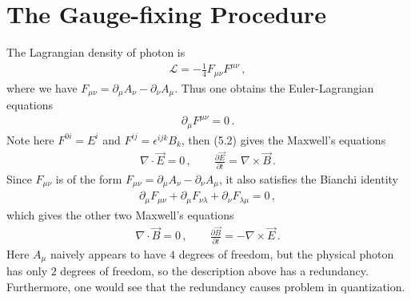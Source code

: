 \documentclass[11pt, onesided]{book}
\theoremstyle{break}
\theoremstyle{break}
\newcommand{\pd}{\partial}
\begin{document}
\section[The Gauge-fixing Procedure]{\color{red}The Gauge-fixing Procedure\color{black}}
The Lagrangian density of photon is
\begin{align}
\mathcal{L} = -\frac{1}{4}F_{\mu\nu}F^{\mu\nu}\,,
\end{align}
where we have $F_{\mu\nu} = \pd_\mu A_\nu - \pd_\nu A_\mu$. Thus one obtains the Euler-Lagrangian equations
\begin{align}
\pd_\mu F^{\mu\nu} = 0\,.
\end{align}
Note here $F^{0i} = E^i$ and $F^{ij} = \epsilon^{ijk}B_k$, then (5.2) gives the Maxwell's equations
\begin{align*}
\nabla \cdot \vec{E} = 0\,,\qquad
\frac{\pd \vec{E}}{\pd t} = \nabla \times \vec{B}\,.
\end{align*}
Since $F_{\mu\nu}$ is of the form $F_{\mu\nu} = \pd_\mu A_\nu - \pd_\nu A_\mu$, it also satisfies the Bianchi identity
\begin{align*}
\pd_\mu F_{\mu\nu} + \pd_\mu F_{\nu\lambda} + \pd_\nu F_{\lambda \mu} = 0\,,
\end{align*}
which gives the other two Maxwell's equations
\begin{align*}
\nabla \cdot \vec{B} = 0\,,\qquad
\frac{\pd \vec{B}}{\pd t} = -\nabla \times \vec{E}\,.
\end{align*}
Here $A_\mu$ naively appears to have $4$ degrees of freedom, but the physical photon has only $2$ degrees of freedom, so the description above has a redundancy. Furthermore, one would see that the redundancy causes problem in quantization. \\
\end{document}
